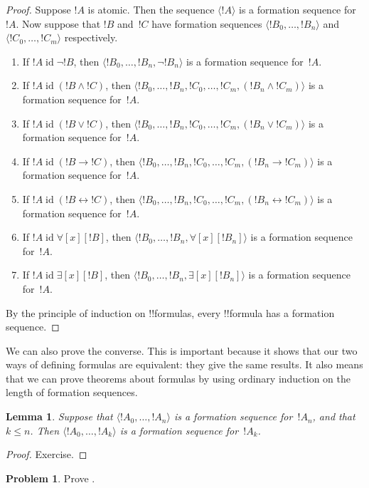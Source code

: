 \documentclass[10pt,a4paper]{article}
\makeatletter
\theoremstyle{plain}
\newtheorem{lem}[thm]{Lemma}
\theoremstyle{definition}
\newtheorem{prob}{Problem}[section]
\theoremstyle{remark}
\newcommand*{\ollabel}[1]{\label{#1}}
\newcommand{\olref}{\@ifnextchar[{\olref@i}{\olref@final}}
\def\olref@i[#1]{\@ifnextchar[{\olref@ii}{\olref@final}}
\def\olref@ii[#1]{\@ifnextchar[{\olref@iii}{\olref@final}}
\def\olref@iii[#1]{\olref@final}
\def\olref@final#1{\ref{#1}}
\providecommand{\lif}{\mathbin{\rightarrow}}
\providecommand{\lforall}{\mathord{\forall}}
\providecommand{\lexists}{\mathord{\exists}}
\providecommand{\tuple}[1]{\langle #1 \rangle}
\providecommand{\tagitem}[1]{\item[#1]}
\providecommand{\liff}{\mathbin{\leftrightarrow}}
\providecommand{\ident}{\operatorname{id}}
\makeatother
\begin{document}
\begin{proof}
Suppose $!A$ is atomic. Then the sequence $\tuple{!A}$ is a
formation sequence for~$!A$.
%
Now suppose that $!B$ and~$!C$ have formation sequences
$\tuple{!B_0,\dotsc,!B_n}$ and $\tuple{!C_0,\dotsc,!C_m}$
respectively.
%
\begin{enumerate}
  \tagitem{prvNot}{If $!A \ident \lnot !B$,
      then $\tuple{!B_0,\dotsc,!B_n,\lnot !B_n}$
      is a formation sequence for~$!A$.}{}
  \tagitem{prvAnd}{If $!A \ident (!B \land !C)$,
      then $\tuple{!B_0,\dotsc,!B_n,!C_0,\dotsc,!C_m,(!B_n \land !C_m)}$
      is a formation sequence for~$!A$.}{}
  \tagitem{prvOr}{If $!A \ident (!B \lor !C)$,
      then $\tuple{!B_0,\dotsc,!B_n,!C_0,\dotsc,!C_m,(!B_n \lor !C_m)}$
      is a formation sequence for~$!A$.}{}
  \tagitem{prvIf}{If $!A \ident (!B \lif !C)$,
      then $\tuple{!B_0,\dotsc,!B_n,!C_0,\dotsc,!C_m,(!B_n \lif !C_m)}$
      is a formation sequence for~$!A$.}{}
  \tagitem{prvIff}{If $!A \ident (!B \liff !C)$,
      then $\tuple{!B_0,\dotsc,!B_n,!C_0,\dotsc,!C_m,(!B_n \liff !C_m)}$
      is a formation sequence for~$!A$.}{}
  \tagitem{prvAll}{If $!A \ident \lforall[x][!B]$,
      then $\tuple{!B_0,\dotsc,!B_n,\lforall[x][!B_n]}$
      is a formation sequence for~$!A$.}{}
  \tagitem{prvEx}{If $!A \ident \lexists[x][!B]$,
      then $\tuple{!B_0,\dotsc,!B_n,\lexists[x][!B_n]}$
      is a formation sequence for~$!A$.}{}
\end{enumerate}
By the principle of induction on !!{formula}s,
every !!{formula} has a formation sequence.
\end{proof}

We can also prove the converse. This is important because it shows
that our two ways of defining formulas are equivalent: they give
the same results. It also means that we can prove theorems about
formulas by using ordinary induction on the length of formation
sequences.

\begin{lem}
\ollabel{lem:fseq-init}
Suppose that $\tuple{!A_0,\dotsc,!A_n}$ is a formation sequence
for~$!A_n$, and that $k \leq n$. Then $\tuple{!A_0,\dotsc,!A_k}$
is a formation sequence for~$!A_k$.
\end{lem}

\begin{proof}
Exercise.
\end{proof}

\begin{prob}
Prove \olref[fol][syn][fseq]{lem:fseq-init}.
\end{prob}
\end{document}
